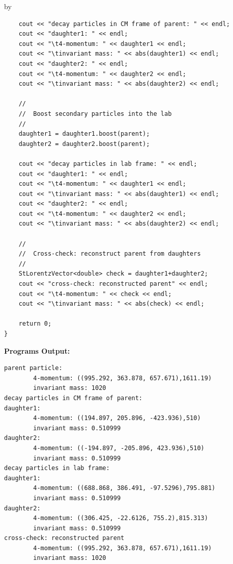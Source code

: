 \documentclass[twoside]{article}
\newcommand{\entrylabel}[1]{\mbox{\textbf{{#1}}}\hfil}%
\newenvironment{entry}
{\begin{list}{}%
    {\renewcommand{\makelabel}{\entrylabel}%
     \setlength{\labelwidth}{90pt}%
     \setlength{\leftmargin}{\labelwidth}
     \advance\leftmargin by \labelsep%
      }%
    }%
  {\end{list}}
\newcommand{\Entrylabel}[1]%
{\raisebox{0pt}[1ex][0pt]{\makebox[\labelwidth][l]%
    {\parbox[t]{\labelwidth}{\hspace{0pt}\textbf{{#1}}}}}}
\newenvironment{Entry}%
{\renewcommand{\entrylabel}{\Entrylabel}\begin{entry}}%
  {\end{entry}}
\begin{document}
\begin{Entry}
{\begin{verbatim}
    cout << "decay particles in CM frame of parent: " << endl;
    cout << "daughter1: " << endl;
    cout << "\t4-momentum: " << daughter1 << endl;
    cout << "\tinvariant mass: " << abs(daughter1) << endl;
    cout << "daughter2: " << endl;
    cout << "\t4-momentum: " << daughter2 << endl;
    cout << "\tinvariant mass: " << abs(daughter2) << endl;
    
    //
    //  Boost secondary particles into the lab
    //
    daughter1 = daughter1.boost(parent);
    daughter2 = daughter2.boost(parent);
    
    cout << "decay particles in lab frame: " << endl;
    cout << "daughter1: " << endl;
    cout << "\t4-momentum: " << daughter1 << endl;
    cout << "\tinvariant mass: " << abs(daughter1) << endl;
    cout << "daughter2: " << endl;
    cout << "\t4-momentum: " << daughter2 << endl;
    cout << "\tinvariant mass: " << abs(daughter2) << endl;

    //
    //  Cross-check: reconstruct parent from daughters
    //
    StLorentzVector<double> check = daughter1+daughter2;
    cout << "cross-check: reconstructed parent" << endl;
    cout << "\t4-momentum: " << check << endl;
    cout << "\tinvariant mass: " << abs(check) << endl;
        
    return 0;
}
\end{verbatim}
}%
{\bf Programs Output:}
{\footnotesize
\begin{verbatim}
parent particle: 
        4-momentum: ((995.292, 363.878, 657.671),1611.19)
        invariant mass: 1020
decay particles in CM frame of parent: 
daughter1: 
        4-momentum: ((194.897, 205.896, -423.936),510)
        invariant mass: 0.510999
daughter2: 
        4-momentum: ((-194.897, -205.896, 423.936),510)
        invariant mass: 0.510999
decay particles in lab frame: 
daughter1: 
        4-momentum: ((688.868, 386.491, -97.5296),795.881)
        invariant mass: 0.510999
daughter2: 
        4-momentum: ((306.425, -22.6126, 755.2),815.313)
        invariant mass: 0.510999
cross-check: reconstructed parent
        4-momentum: ((995.292, 363.878, 657.671),1611.19)
        invariant mass: 1020
\end{verbatim}
} %
\end{Entry}

\clearpage

%
%
\end{document}
